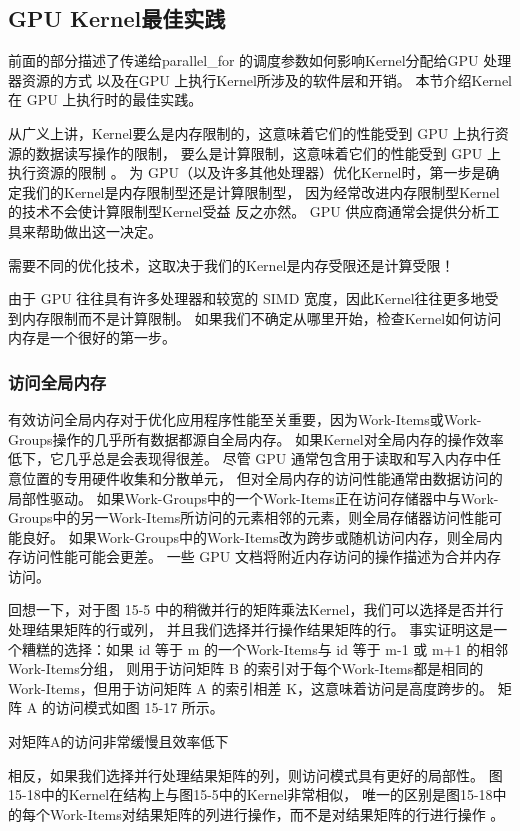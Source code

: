 \subsection{GPU Kernel最佳实践}
前面的部分描述了传递给parallel\_for 的调度参数如何影响Kernel分配给GPU 处理器资源的方式
以及在GPU 上执行Kernel所涉及的软件层和开销。 本节介绍Kernel在 GPU 上执行时的最佳实践。

从广义上讲，Kernel要么是内存限制的，这意味着它们的性能受到 GPU 上执行资源的数据读写操作的限制，
要么是计算限制，这意味着它们的性能受到 GPU 上执行资源的限制 。 
为 GPU（以及许多其他处理器）优化Kernel时，第一步是确定我们的Kernel是内存限制型还是计算限制型，
因为经常改进内存限制型Kernel的技术不会使计算限制型Kernel受益 反之亦然。 
GPU 供应商通常会提供分析工具来帮助做出这一决定。

\begin{remark}
	需要不同的优化技术，这取决于我们的Kernel是内存受限还是计算受限！
\end{remark}

由于 GPU 往往具有许多处理器和较宽的 SIMD 宽度，因此Kernel往往更多地受到内存限制而不是计算限制。 
如果我们不确定从哪里开始，检查Kernel如何访问内存是一个很好的第一步。

\subsubsection{访问全局内存}
有效访问全局内存对于优化应用程序性能至关重要，因为Work-Items或Work-Groups操作的几乎所有数据都源自全局内存。 
如果Kernel对全局内存的操作效率低下，它几乎总是会表现得很差。 
尽管 GPU 通常包含用于读取和写入内存中任意位置的专用硬件收集和分散单元，
但对全局内存的访问性能通常由数据访问的局部性驱动。 
如果Work-Groups中的一个Work-Items正在访问存储器中与Work-Groups中的另一Work-Items所访问的元素相邻的元素，则全局存储器访问性能可能良好。 
如果Work-Groups中的Work-Items改为跨步或随机访问内存，则全局内存访问性能可能会更差。 
一些 GPU 文档将附近内存访问的操作描述为合并内存访问。

回想一下，对于图 15-5 中的稍微并行的矩阵乘法Kernel，我们可以选择是否并行处理结果矩阵的行或列，
并且我们选择并行操作结果矩阵的行。 
事实证明这是一个糟糕的选择：如果 id 等于 m 的一个Work-Items与 id 等于 m-1 或 m+1 的相邻Work-Items分组，
则用于访问矩阵 B 的索引对于每个Work-Items都是相同的 Work-Items，但用于访问矩阵 A 的索引相差 K，这意味着访问是高度跨步的。 
矩阵 A 的访问模式如图 15-17 所示。

{\color{red} 对矩阵A的访问非常缓慢且效率低下}

相反，如果我们选择并行处理结果矩阵的列，则访问模式具有更好的局部性。 
图15-18中的Kernel在结构上与图15-5中的Kernel非常相似，
唯一的区别是图15-18中的每个Work-Items对结果矩阵的列进行操作，而不是对结果矩阵的行进行操作 。

